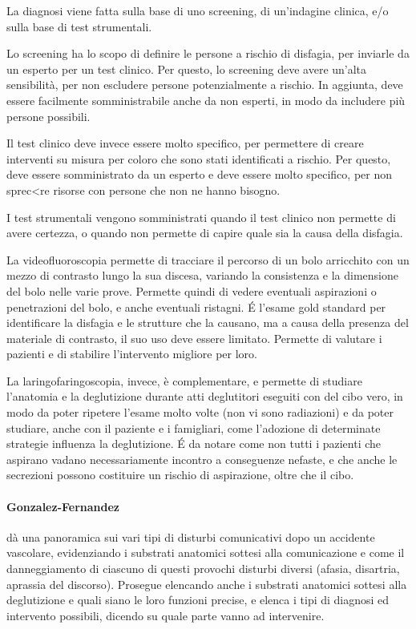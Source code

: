 La diagnosi viene fatta sulla base di uno screening, di un'indagine clinica, 
e/o sulla base di test strumentali.

Lo screening ha lo scopo di definire le persone a rischio di disfagia, per 
inviarle da un esperto per un test clinico.
Per questo, lo screening deve avere un'alta sensibilità, per non escludere 
persone potenzialmente a rischio.
In aggiunta, deve essere facilmente somministrabile anche da non esperti, in 
modo da includere più persone possibili.

Il test clinico deve invece essere molto specifico, per permettere di creare 
interventi su misura per coloro che sono stati identificati a rischio.
Per questo, deve essere somministrato da un esperto e deve essere molto 
specifico, per non sprec<re risorse con persone che non ne hanno bisogno.

I test strumentali vengono somministrati quando il test clinico non permette di 
avere certezza, o quando non permette di capire quale sia la causa della 
disfagia.

La videofluoroscopia permette di tracciare il percorso di un bolo arricchito 
con un mezzo di contrasto lungo la sua discesa, variando la consistenza e la 
dimensione del bolo nelle varie prove.
Permette quindi di vedere eventuali aspirazioni o penetrazioni del bolo, e 
anche eventuali ristagni.
\'E l'esame gold standard per identificare la disfagia e le strutture che la 
causano, ma a causa della presenza del materiale di contrasto, il suo uso deve 
essere limitato.
Permette di valutare i pazienti e di stabilire l'intervento migliore per loro.

La laringofaringoscopia, invece, è complementare, e permette di studiare 
l'anatomia e la deglutizione durante atti deglutitori eseguiti con del cibo 
vero, in modo da poter ripetere l'esame molto volte (non vi sono radiazioni) e 
da poter studiare, anche con il paziente e i famigliari, come l'adozione di 
determinate strategie influenza la deglutizione.
\'E da notare come non tutti i pazienti che aspirano vadano necessariamente 
incontro a conseguenze nefaste, e che anche le secrezioni possono costituire un 
rischio di aspirazione, oltre che il cibo.

\paragraph{Gonzalez-Fernandez} \label{par:gon} \cite{GonzlezFernndez2015} dà 
una panoramica sui vari tipi di disturbi comunicativi dopo un accidente 
vascolare, evidenziando i substrati anatomici sottesi alla comunicazione e come 
il danneggiamento di ciascuno di questi provochi disturbi diversi (afasia, 
disartria, aprassia del discorso).
Prosegue elencando anche i substrati anatomici sottesi alla deglutizione e 
quali siano le loro funzioni precise, e elenca i tipi di diagnosi ed intervento 
possibili, dicendo su quale parte vanno ad intervenire.

